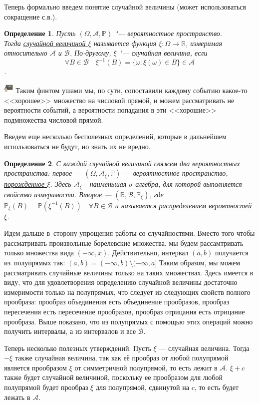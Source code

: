 \documentclass[12pt]{article}
\newtheorem{Def}{Определение}
\newenvironment{Wtf}{\includegraphics[height=5mm]{ping}}{}
\numberwithin{Th}{section}
\numberwithin{Def}{section}
\numberwithin{Lem}{section}
\numberwithin{St}{section}
\numberwithin{equation}{section}
\newcommand\Pro{\mathbb{P}} %
\newcommand\Ev{\mathscr{A}} %
\newcommand\Bor{\mathscr{B}} %
\newcommand\Real{\mathbb{R}} %
\begin{document}
Теперь формально введем понятие случайной величины (может использоваться сокращение с.в.).

\begin{Def}
Пусть $(\Omega, \Ev, \Pro)$ "--- вероятностное пространство.\\ Тогда \underline{случайной величиной $\xi$} называется функция $\xi : \Omega \to \Real$, измеримая относительно $\Ev$ и $\Bor$. По-другому, $\xi$ "--- случайная величина, если
$$\forall B \in \Bor \quad \xi^{-1}(B) = \lbrace \omega : \xi(\omega) \in B \rbrace \in \Ev$$.
\end{Def}
\begin{Wtf}
Таким финтом ушами мы, по сути, сопоставили каждому событию какое-то <<хорошее>> множество на числовой прямой, и можем рассматривать не вероятности событий, а вероятности попадания в эти <<хорошие>> подмножества числовой прямой.
\end{Wtf}

Введем еще несколько бесполезных определений, которые в дальнейшем использоваться не будут, но знать их не вредно.

\begin{Def}
С каждой случайной величиной свяжем два вероятностных пространства: первое --- $(\Omega, \Ev_\xi, \Pro)$ --- вероятностное пространство, \underline{порожденное $\xi$}. Здесь 
$\Ev_\xi$ - наименьшая $\sigma$-алгебра, для которой выполняется свойство измеримости. Второе --- $(\Real, \Bor, \Pro_\xi)$, где $\Pro_\xi(B) = \Pro(\xi^{-1}(B)) \quad \forall B \in \Bor$ и называется \underline{распределением вероятностей $\xi$}.
\end{Def}

Идем дальше в~сторону упрощения работы со случайностями. Вместо того чтобы рассматривать произвольные борелевские множества, мы будем рассамтривать только множества вида $(-\infty, x)$. Действительно, интервал $(a, b)$ получается из~полупрямых так: $(a, b) = (-\infty, b) \setminus (-\infty, a]$  Таким образом, мы можем рассматривать случайные величины только на таких множествах. Здесь имеется в виду, что для удовлетворения определению случайной величины достаточно измеримости только на
 полупрямых, что следует из следующих свойств полного прообраза: прообраз объединения есть объединение прообразов, прообраз пересечения есть пересечение прообразов,
 прообраз отрицания есть отрицание прообраза. Выше показано, что из полупрямых с помощью этих операций можно получить интервалы, а из интервалов и все $\Bor$.

Теперь несколько полезных утверждений. Пусть $\xi$ --- случайная величина. Тогда $-\xi$ также случайная величина, так как её прообраз от любой полупрямой является
прообразом $\xi$ от симметричной полупрямой, то есть лежит в $\Ev$. $\xi + c$ также будет случайной величиной, поскольку ее прообразом для любой полупрямой будет
прообраз $\xi$ для полупрямой, сдвинутой на $c$, то есть будет лежать в $\Ev$.
\end{document}
